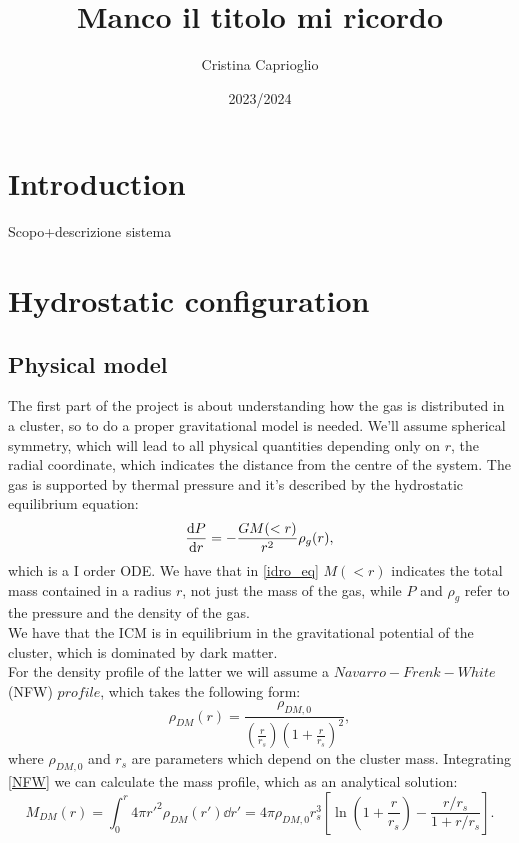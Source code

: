 \documentclass{article}
\title{Manco il titolo mi ricordo}
\author{Cristina Caprioglio}
\date{2023/2024 }
\begin{document}
\maketitle

\section*{Introduction}
Scopo+descrizione sistema
\section{Hydrostatic configuration}
\subsection{Physical model}
The first part of the project is about understanding how the gas is distributed in a cluster, so to do a proper gravitational model is needed.
We'll assume spherical symmetry, which will lead to all physical quantities depending only on $r$, the radial coordinate, which indicates the distance from the centre of the system.
The gas is supported by thermal pressure and it's described by the hydrostatic equilibrium equation:
\begin{equation}\label{idro_eq}
	\derivative{P}{r}=-\frac{GM(<r)}{r^{2}}\rho_{g}(r),
\end{equation}
which is a I order ODE. We have that in \eqref{idro_eq} $M(<r)$ indicates the total mass contained in a radius $r$, not just the mass of the gas, while $P$ and $\rho_{g}$ refer to the pressure and the density of the gas. \\
We have that the ICM is in equilibrium in the gravitational potential of the cluster, which is dominated by dark matter. \\
For the density profile of the latter we will assume a $Navarro-Frenk-White$ (NFW) $profile$, which takes the following form:
\begin{equation}\label{NFW}
	\rho_{DM}(r)=\frac{\rho_{DM,0}}{\left(\frac{r}{r_{s}}\right)\left(1+\frac{r}{r_{s}}\right)^{2}},
\end{equation}
where $\rho_{DM,0}$ and $r_{s}$ are parameters which depend on the cluster mass. 
Integrating \eqref{NFW} we can calculate the mass profile, which as an analytical solution:
\begin{equation}\label{massDM}
	M_{DM}(r)=\int_{0}^{r}4\pi r'^{2}\rho_{DM}(r')\dd{r'}=4\pi\rho_{DM,0}r_{s}^{3}\left[\ln\left(1+\frac{r}{r_{s}}\right)-\frac{r/r_{s}}{1+r/r_{s}}\right].
\end{equation}
\end{document}
